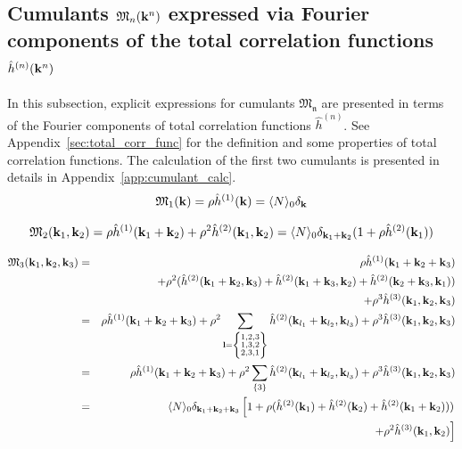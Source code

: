 \subsection{\label{sec:cumulants_via_h} Cumulants $\mathfrak M_n(\vb k^n)$ expressed via Fourier components of the total correlation functions $\hat{h}^{(n)}(\vb k^n)$}
In this subsection, explicit expressions for cumulants $\mathfrak{M_n}$ are presented in terms of the Fourier components of total correlation functions $\hat{h}^{(n)}$. See Appendix~\ref{sec:total_corr_func} for the definition and some properties of total correlation functions. The calculation of the first two cumulants is presented in details in Appendix~\ref{app:cumulant_calc}.
\begin{equation}
\label{CumulantM1}
	\mathfrak M_1(\vb k) = \rho \hat{h}^{(1)}(\vb k) = \langle N \rangle_0 \delta_{\vb k}
\end{equation}

\begin{equation}
	\label{CumulantM2}
	\mathfrak M_2(\vb k_1, \vb k_2) = \rho \hat{h}^{(1)}(\vb k_1 + \vb k_2) + \rho^2\hat{h}^{(2)}(\vb k_1, \vb k_2) = \langle N \rangle_0 \delta_{\vb k_1 + \vb k_2} (1 + \rho \hat{h}^{(2)}(\vb k_1))
\end{equation}

\begin{eqnarray}
	\label{CumulantM3}
	\mathfrak M_3 (\vb k_1, \vb k_2, \vb k_3) &=& \rho \hat{h}^{(1)}(\vb k_1 + \vb k_2 + \vb k_3) \nonumber \\
	&&+ \rho^2(\hat{h}^{(2)}(\vb k_1 + \vb k_2, \vb k_3) + \hat{h}^{(2)}(\vb k_1 + \vb k_3, \vb k_2) + \hat{h}^{(2)}(\vb k_2 + \vb k_3, \vb k_1))  \nonumber \\
	&&+ \rho^3 \hat{h}^{(3)}(\vb k_1, \vb k_2, \vb k_3) 
	\nonumber \\
	&=& \rho \hat{h}^{(1)}(\vb k_1 + \vb k_2 + \vb k_3) + 
	\rho^2 \sum_{{\vb l}=\left\{ \substack{1,2,3 \\ 1,3,2 \\ 2,3,1}
 		\right\}}
	\hat{h}^{(2)}(\vb k_{l_1} + \vb k_{l_2}, \vb k_{l_3})
	+ \rho^3 \hat{h}^{(3)}(\vb k_1, \vb k_2, \vb k_3)
	\nonumber \\
	&=& \rho \hat{h}^{(1)}(\vb k_1 + \vb k_2 + \vb k_3) + 
	\rho^2 \sum_{\left\{3 \right\}}
	\hat{h}^{(2)}(\vb k_{l_1} + \vb k_{l_2}, \vb k_{l_3})
	+ \rho^3 \hat{h}^{(3)}(\vb k_1, \vb k_2, \vb k_3)
	\nonumber \\
	&=& \langle N \rangle_0 \delta_{\vb k_1 + \vb k_2 + \vb k_3} 
	\left[ 1 + \rho(\hat{h}^{(2)}(\vb k_1) + \hat{h}^{(2)}(\vb k_2) + \hat{h}^{(2)}(\vb k_1 + \vb k_2)) )\right. \nonumber\\
	&& \left. + \rho^2 \hat{h}^{(3)}(\vb k_1, \vb k_2) \right]
\end{eqnarray}

